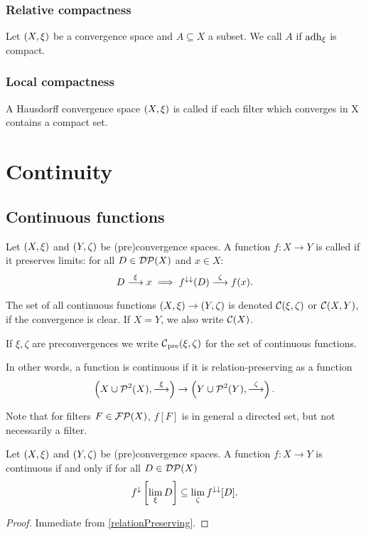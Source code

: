 \subsection{Relative compactness}
\begin{definition}
Let $\left( X,\xi \right)$ be a convergence space and $A\subseteq X$ a subset. We call $A$  if $\operatorname{adh}_\xi$ is compact.
\end{definition}

\subsection{Local compactness}
\begin{definition}
A Hausdorff convergence space $\left( X, \xi \right)$ is called 
if each filter which converges in X contains a compact set.
\end{definition}


\chapter{Continuity}
\section{Continuous functions}
\begin{definition}
Let $\left( X,\xi \right)$ and $\left( Y,\zeta \right)$ be (pre)convergence spaces. A function $f: X\to Y$ is called  if it preserves limits: for all $D \in \operatorname{\mathcal{DP}}(X)$ and $x\in X$:
\[ D \overset{\xi}{\longrightarrow} x \implies f^{\downarrow\downarrow}(D) \overset{\zeta}{\longrightarrow} f(x). \]

The set of all continuous functions $\left( X,\xi \right) \to \left( Y,\zeta \right)$ is denoted $\operatorname{\mathcal{C}}(\xi, \zeta)$ or $\operatorname{\mathcal{C}}(X,Y)$, if the convergence is clear. If $X=Y$, we also write $\operatorname{\mathcal{C}}(X)$.

If $\xi,\zeta$ are preconvergences we write $\operatorname{\mathcal{C}}_\text{pre}(\xi, \zeta)$ for the set of continuous functions.
\end{definition}
In other words, a function is continuous if it is relation-preserving as a function
\[ \left( X \cup \operatorname{\mathcal{P}}^2(X), \overset{\xi}{\longrightarrow} \right) \to \left( Y \cup \operatorname{\mathcal{P}}^2(Y), \overset{\zeta}{\longrightarrow} \right). \]

Note that for filters $F\in\operatorname{\mathcal{FP}}(X)$, $f[F]$ is in general a directed set, but not necessarily a filter.

\begin{lemma}
Let $\left( X,\xi \right)$ and $\left( Y,\zeta \right)$ be (pre)convergence spaces. A function $f: X\to Y$ is continuous \textup{if and only if} for all $D \in \operatorname{\mathcal{DP}}(X)$
\[ f^{\downarrow}\left[\lim_\xi D \right] \subseteq \lim_\zeta f^{\downarrow\downarrow}[D]. \]
\end{lemma}
\begin{proof}
Immediate from \ref{relationPreserving}.
\end{proof}

